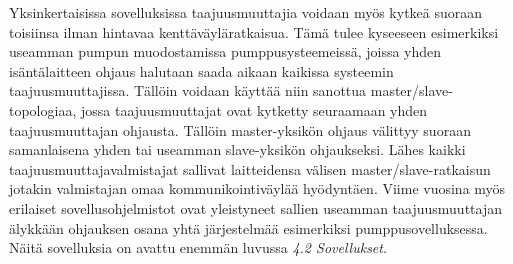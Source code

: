\documentclass[finnish,12pt,a4paper,pdftex,elec,utf8]{aaltothesis}
\begin{document}
Yksinkertaisissa sovelluksissa taajuusmuuttajia voidaan myös kytkeä suoraan toisiinsa ilman hintavaa kenttäväyläratkaisua. Tämä tulee kyseeseen esimerkiksi useamman pumpun muodostamissa pumppusysteemeissä, joissa yhden isäntälaitteen ohjaus halutaan saada aikaan kaikissa systeemin taajuusmuuttajissa. Tällöin voidaan käyttää niin sanottua master/slave-topologiaa, jossa taajuusmuuttajat ovat kytketty seuraamaan yhden taajuusmuuttajan ohjausta. Tällöin master-yksikön ohjaus välittyy suoraan samanlaisena yhden tai useamman slave-yksikön ohjaukseksi. Lähes kaikki taajuusmuuttajavalmistajat sallivat laitteidensa välisen master/slave-ratkaisun jotakin valmistajan omaa kommunikointiväylää hyödyntäen. Viime vuosina myös erilaiset sovellusohjelmistot ovat yleistyneet sallien useamman taajuusmuuttajan älykkään ohjauksen osana yhtä järjestelmää esimerkiksi pumppusovelluksessa. Näitä sovelluksia on avattu enemmän luvussa  \textit{4.2 Sovellukset}. \cite{880hwman}


\end{document}
